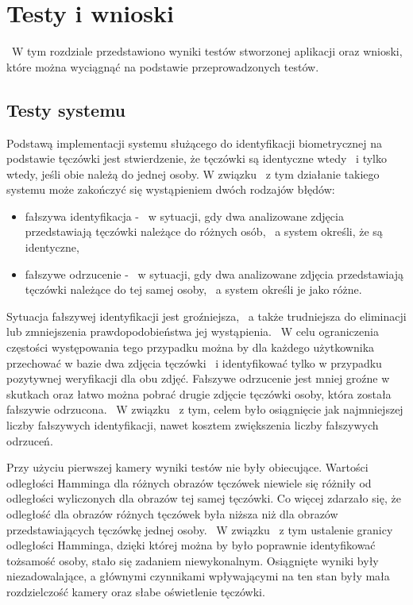 \chapter{Testy i wnioski}
\label{cha:testywnioski}
~W tym rozdziale przedstawiono wyniki testów stworzonej aplikacji oraz wnioski, które można wyciągnąć na podstawie przeprowadzonych testów.

\section{Testy systemu}
\label{sec:testy}
Podstawą implementacji systemu służącego do identyfikacji biometrycznej na podstawie tęczówki jest stwierdzenie, że tęczówki są identyczne wtedy ~i tylko wtedy, jeśli obie należą do jednej osoby. W związku ~z tym działanie takiego systemu może zakończyć się wystąpieniem dwóch rodzajów błędów:
\begin{itemize}
\item fałszywa identyfikacja - ~w sytuacji, gdy dwa analizowane zdjęcia przedstawiają tęczówki należące do różnych osób, ~a system określi, że są identyczne,
\item fałszywe odrzucenie - ~w sytuacji, gdy dwa analizowane zdjęcia przedstawiają tęczówki należące do tej samej osoby, ~a system określi je jako różne.
\end{itemize}
Sytuacja fałszywej identyfikacji jest groźniejsza, ~a także trudniejsza do eliminacji lub zmniejszenia prawdopodobieństwa jej wystąpienia. ~W celu ograniczenia częstości występowania tego przypadku można by dla każdego użytkownika przechować w bazie dwa zdjęcia tęczówki ~i identyfikować tylko w przypadku pozytywnej weryfikacji dla obu zdjęć. Fałszywe odrzucenie jest mniej groźne w skutkach oraz łatwo można pobrać drugie zdjęcie tęczówki osoby, która została fałszywie odrzucona. ~W związku ~z tym, celem było osiągnięcie jak najmniejszej liczby fałszywych identyfikacji, nawet kosztem zwiększenia liczby fałszywych odrzuceń.

Przy użyciu pierwszej kamery wyniki testów nie były obiecujące. Wartości odległości Hamminga dla różnych obrazów tęczówek niewiele się różniły od odległości wyliczonych dla obrazów tej samej tęczówki. Co więcej zdarzało się, że odległość dla obrazów różnych tęczówek była niższa niż dla obrazów przedstawiających tęczówkę jednej osoby. ~W związku ~z tym ustalenie granicy odległości Hamminga, dzięki której można by było poprawnie identyfikować tożsamość osoby, stało się zadaniem niewykonalnym. Osiągnięte wyniki były niezadowalające, a głównymi czynnikami wpływającymi na ten stan były mała rozdzielczość kamery oraz słabe oświetlenie tęczówki.

